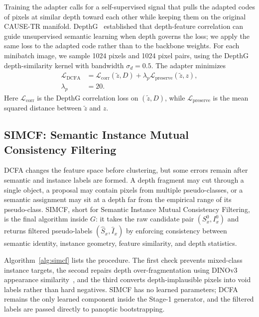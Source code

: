 \documentclass[10pt,twocolumn,letterpaper]{article}
\newcounter{algorithm}
\begin{document}
Training the adapter calls for a self-supervised signal that pulls the adapted codes of pixels at similar depth toward each other while keeping them on the original CAUSE-TR manifold. DepthG~\cite{sick2024depthg} established that depth-feature correlation can guide unsupervised semantic learning when depth governs the loss; we apply the same loss to the adapted code rather than to the backbone weights. For each minibatch image, we sample 1024 pixels and 1024 pixel pairs, using the DepthG depth-similarity kernel with bandwidth $\sigma_d = 0.5$. The adapter minimizes
\begin{equation}
\begin{aligned}
\mathcal{L}_\text{DCFA}
&= \mathcal{L}_\text{corr}(\tilde z, D)
 + \lambda_p \mathcal{L}_\text{preserve}(\tilde z, z), \\
\lambda_p &= 20 .
\end{aligned}
\label{eq:dcfa_loss}
\end{equation}
Here $\mathcal{L}_\text{corr}$ is the DepthG correlation loss on $(\tilde z,D)$, while $\mathcal{L}_\text{preserve}$ is the mean squared distance between $\tilde z$ and $z$.
\subsection{SIMCF: Semantic Instance Mutual Consistency Filtering}
\label{sec:method:simcf}

DCFA changes the feature space before clustering, but some errors remain after semantic and instance labels are formed. A depth fragment may cut through a single object, a proposal may contain pixels from multiple pseudo-classes, or a semantic assignment may sit at a depth far from the empirical range of its pseudo-class. SIMCF, short for Semantic Instance Mutual Consistency Filtering, is the final algorithm inside $G$: it takes the raw candidate pair $(S_x^0, I_x^0)$ and returns filtered pseudo-labels $(\hat S_x, \hat I_x)$ by enforcing consistency between semantic identity, instance geometry, feature similarity, and depth statistics.

Algorithm~\ref{alg:simcf} lists the procedure. The first check prevents mixed-class instance targets, the second repairs depth over-fragmentation using DINOv3 appearance similarity~\cite{simeoni2025dinov3}, and the third converts depth-implausible pixels into void labels rather than hard negatives. SIMCF has no learned parameters; DCFA remains the only learned component inside the Stage-1 generator, and the filtered labels are passed directly to panoptic bootstrapping.
\end{document}
